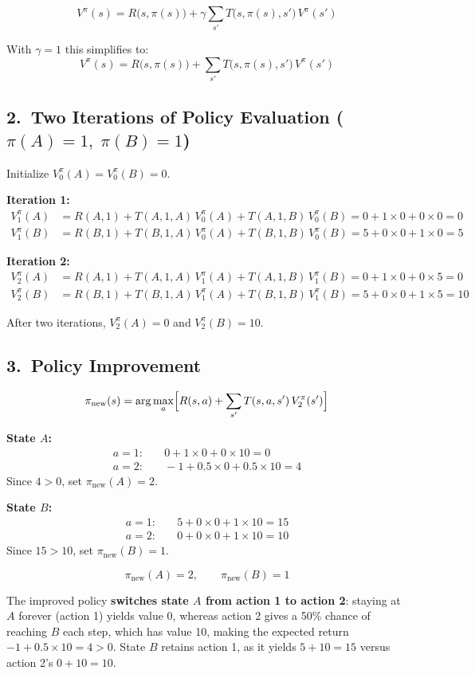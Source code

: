 \documentclass[12pt]{article}
\begin{document}
\[
V^{\pi}(s)=R\bigl(s,\pi(s)\bigr)+\gamma\sum_{s'}T\bigl(s,\pi(s),s'\bigr)\,V^{\pi}(s')
\]

With $\gamma=1$ this simplifies to:
\[
V^{\pi}(s)=R\bigl(s,\pi(s)\bigr)+\sum_{s'}T\bigl(s,\pi(s),s'\bigr)\,V^{\pi}(s')
\]

\subsection*{2.\ Two Iterations of Policy Evaluation ($\pi(A)=1,\;\pi(B)=1$)}

Initialize $V^{\pi}_0(A)=V^{\pi}_0(B)=0$.

\textbf{Iteration 1:}
\begin{align*}
V^{\pi}_1(A)&=R(A,1)+T(A,1,A)\,V^{\pi}_0(A)+T(A,1,B)\,V^{\pi}_0(B)
             =0+1\times0+0\times0=0\\
V^{\pi}_1(B)&=R(B,1)+T(B,1,A)\,V^{\pi}_0(A)+T(B,1,B)\,V^{\pi}_0(B)
             =5+0\times0+1\times0=5
\end{align*}

\textbf{Iteration 2:}
\begin{align*}
V^{\pi}_2(A)&=R(A,1)+T(A,1,A)\,V^{\pi}_1(A)+T(A,1,B)\,V^{\pi}_1(B)
             =0+1\times0+0\times5=\boxed{0}\\
V^{\pi}_2(B)&=R(B,1)+T(B,1,A)\,V^{\pi}_1(A)+T(B,1,B)\,V^{\pi}_1(B)
             =5+0\times0+1\times5=\boxed{10}
\end{align*}

After two iterations, $V^{\pi}_2(A)=0$ and $V^{\pi}_2(B)=10$.

\subsection*{3.\ Policy Improvement}

\[
\pi_{\text{new}}(s)=\arg\max_{a}\Bigl[R(s,a)+\sum_{s'}T(s,a,s')\,V^{\pi}_2(s')\Bigr]
\]

\textbf{State $A$:}
\begin{align*}
a=1:&\quad 0+1\times0+0\times10=0\\
a=2:&\quad -1+0.5\times0+0.5\times10=4
\end{align*}
Since $4>0$, set $\pi_{\text{new}}(A)=2$.

\textbf{State $B$:}
\begin{align*}
a=1:&\quad 5+0\times0+1\times10=15\\
a=2:&\quad 0+0\times0+1\times10=10
\end{align*}
Since $15>10$, set $\pi_{\text{new}}(B)=1$.

\[
\boxed{\pi_{\text{new}}(A)=2,\qquad\pi_{\text{new}}(B)=1}
\]

The improved policy \textbf{switches state $A$ from action 1 to action 2}: staying at $A$
forever (action 1) yields value 0, whereas action 2 gives a 50\% chance of reaching $B$
each step, which has value 10, making the expected return $-1+0.5\times10=4>0$.
State $B$ retains action 1, as it yields $5+10=15$ versus action 2's $0+10=10$.
\end{document}
